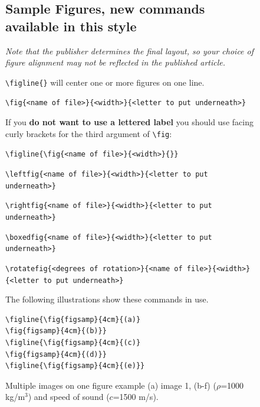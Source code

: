 \documentclass[reprint]{JASA}
\begin{document}
\begin{figure}[p]
\parskip=6pt
\baselineskip=12pt

\subsection{Sample Figures, new commands available in this style}

{\it Note that the publisher determines the final layout, so 
your choice of figure alignment may not be reflected in the published
article.}

\noindent
\verb+\figline{}+ will center one or more figures on one line. 


\noindent
\verb+\fig{<name of file>}{<width>}{<letter to put underneath>}+

If you {\bf do not want to use a lettered label} you should use facing
curly brackets for the third argument of \verb+\fig+:

\verb+\figline{\fig{<name of file>}{<width>}{}}+

\noindent
\verb+\leftfig{<name of file>}{<width>}{<letter to put underneath>}+

\noindent
\verb+\rightfig{<name of file>}{<width>}{<letter to put underneath>}+

\noindent
\verb+\boxedfig{<name of file>}{<width>}{<letter to put underneath>}+

\noindent
\verb+\rotatefig{<degrees of rotation>}{<name of file>}{<width>}+\\
\verb+{<letter to put underneath>}+

The following illustrations show these commands in use.


\begin{verbatim}
\figline{\fig{figsamp}{4cm}{(a)}
\fig{figsamp}{4cm}{(b)}}
\figline{\fig{figsamp}{4cm}{(c)}
\fig{figsamp}{4cm}{(d)}}
\figline{\fig{figsamp}{4cm}{(e)}}
\end{verbatim}


\caption{ \label{fig:pressure_field} Multiple images on one figure example (a) image 1, (b-f) ($\rho$=1000 kg/m$^3$) and speed of sound ($c$=1500 m/s).}

\end{figure}
\end{document}
